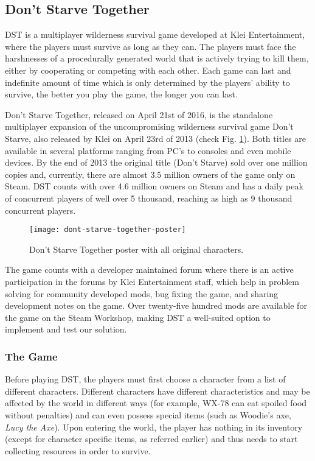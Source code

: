 \subsection{Don't Starve Together}
\ac{DST} is a multiplayer wilderness survival game developed at Klei Entertainment, where the players must survive as long as they can.
The players must face the harshnesses of a procedurally generated world that is actively trying to kill them, either by cooperating or competing with each other.
Each game can last and indefinite amount of time which is only determined by the players' ability to survive, the better you play the game, the longer you can last.

Don't Starve Together, released on April 21st of 2016, is the standalone multiplayer expansion of the uncompromising wilderness survival game Don't Starve, also released by Klei on April 23rd of 2013 (check Fig. \ref{fig:don't-starve-together-poster}).
Both titles are available in several platforms ranging from PC's to consoles and even mobile devices.
By the end of 2013 the original title (Don't Starve) sold over one million copies and, currently, there are almost 3.5 million owners of the game only on Steam.
\ac{DST} counts with over 4.6 million owners on Steam and has a daily peak of concurrent players of well over 5 thousand, reaching as high as 9 thousand concurrent players.

\begin{figure}
  \centering
    \texttt{[image: dont-starve-together-poster]}
  \caption{Don't Starve Together poster with all original characters.}
  \label{fig:don't-starve-together-poster}
\end{figure}

The game counts with a developer maintained forum where there is an active participation in the forums by Klei Entertainment staff, which help in problem solving for community developed mods, bug fixing the game, and sharing development notes on the game.
Over twenty-five hundred mods are available for the game on the Steam Workshop, making \ac{DST} a well-suited option to implement and test our solution.

\subsubsection{The Game}
Before playing \ac{DST}, the players must first choose a character from a list of different characters.
Different characters have different characteristics and may be affected by the world in different ways (for example, WX-78 can eat spoiled food without penalties) and can even possess special items (such as Woodie's axe, \textit{Lucy the Axe}).
Upon entering the world, the player has nothing in its inventory (except for character specific items, as referred earlier) and thus needs to start collecting resources in order to survive.

